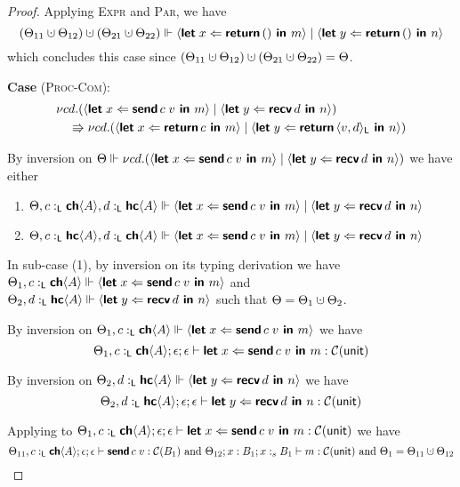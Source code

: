 \begin{proof}
  \noindent
  Applying \textsc{Expr} and \textsc{Par}, we have
  $$
    (\Theta_{11} \dotcup \Theta_{12}) \dotcup (\Theta_{21} \dotcup \Theta_{22}) \Vdash 
    \proc{\letin{x}{\return{\ii}}{m}} \mid \proc{\letin{y}{\return{\ii}}{n}}
  $$
  which concludes this case since $(\Theta_{11} \dotcup \Theta_{12}) \dotcup (\Theta_{21} \dotcup \Theta_{22}) = \Theta$.

\noindent
\textbf{Case} (\textsc{Proc-Com}):
  \begin{align*}
    &\scope{cd}{(\proc{\letin{x}{\appR{\sendR{c}}{v}}{m}} \mid \proc{\letin{y}{\recvR{d}}{n}})} \\
    &\quad\Rrightarrow 
     \scope{cd}{(\proc{\letin{x}{\return{c}}{m}} \mid \proc{\letin{y}{\return{\pairR{v}{d}{\Ln}}}{n}})}
  \end{align*}

  By inversion on $\Theta \Vdash \scope{cd}{(\proc{\letin{x}{\appR{\sendR{c}}{v}}{m}} \mid \proc{\letin{y}{\recvR{d}}{n}})}$ we have either
  \begin{enumerate}
    \item $\Theta, c \tL \CH{A}, d \tL \HC{A} \Vdash \proc{\letin{x}{\appR{\sendR{c}}{v}}{m}} \mid \proc{\letin{y}{\recvR{d}}{n}}$
    \item $\Theta, c \tL \HC{A}, d \tL \CH{A} \Vdash \proc{\letin{x}{\appR{\sendR{c}}{v}}{m}} \mid \proc{\letin{y}{\recvR{d}}{n}}$
  \end{enumerate}

  In sub-case (1), by inversion on its typing derivation we have
  ${\Theta_1, c \tL \CH{A} \Vdash \proc{\letin{x}{\appR{\sendR{c}}{v}}{m}}}$ and
  ${\Theta_2, d \tL \HC{A} \Vdash \proc{\letin{y}{\recvR{d}}{n}}}$ such that ${\Theta = \Theta_1 \dotcup \Theta_2}$.

  \noindent
  By inversion on $\Theta_1, c \tL \CH{A} \Vdash \proc{\letin{x}{\appR{\sendR{c}}{v}}{m}}$ we have
  $$\Theta_1, c \tL \CH{A} ; \epsilon ; \epsilon \vdash \letin{x}{\appR{\sendR{c}}{v}}{m} : \CM{\unit}$$

  \noindent
  By inversion on $\Theta_2, d \tL \HC{A} \Vdash \proc{\letin{y}{\recvR{d}}{n}}$ we have
  $$\Theta_2, d \tL \HC{A} ; \epsilon ; \epsilon \vdash \letin{y}{\recvR{d}}{n} : \CM{\unit}$$

  \noindent
  Applying  to 
  $\Theta_1, c \tL \CH{A} ; \epsilon ; \epsilon \vdash \letin{x}{\appR{\sendR{c}}{v}}{m} : \CM{\unit}$
  we have
  $$
    \Theta_{11}, c \tL \CH{A} ; \epsilon ; \epsilon \vdash \appR{\sendR{c}}{v} : \CM{B_1}
    \text{ and }
    \Theta_{12} ; x : B_1 ; x :_s B_1 \vdash m : \CM{\unit}
    \text{ and } {\Theta_1 = \Theta_{11} \dotcup \Theta_{12}}
  $$


\end{proof}
